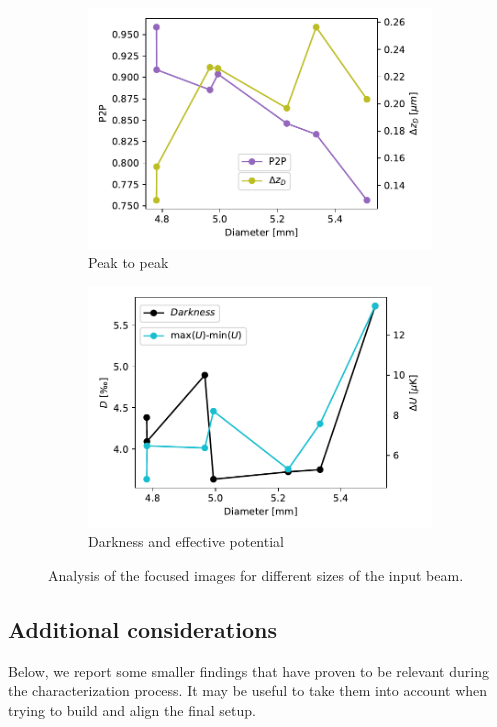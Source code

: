 \begin{figure}
    \begin{subfigure}{0.5\textwidth}
        \includegraphics[width=\textwidth]{chapters/chapter_3/figures/p2p.pdf}
        \caption{Peak to peak}
    \end{subfigure}
    \begin{subfigure}{0.5\textwidth}
        \includegraphics[width=\textwidth]{chapters/chapter_3/figures/darkenss.pdf}
        \caption{Darkness and effective potential}
        \label{fig:diam_dark}
    \end{subfigure}
    \caption{Analysis of the focused images for different sizes of the input beam.}
    \label{fig:analysis_diam}
\end{figure}

\subsection{Additional considerations}
Below, we report some smaller findings that have proven to be relevant during the characterization process. It may be useful to take them into account when trying to build and align the final setup.

